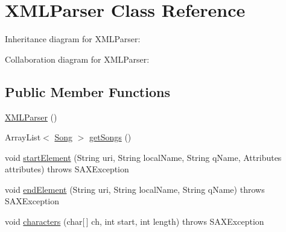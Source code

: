 \hypertarget{classcom_1_1axcoto_1_1shinjuku_1_1maki_1_1_x_m_l_parser}{\section{\-X\-M\-L\-Parser \-Class \-Reference}
\label{classcom_1_1axcoto_1_1shinjuku_1_1maki_1_1_x_m_l_parser}
}


\-Inheritance diagram for \-X\-M\-L\-Parser\-:


\-Collaboration diagram for \-X\-M\-L\-Parser\-:
\subsection*{\-Public \-Member \-Functions}
\begin{DoxyCompactItemize}
\item 
\hyperlink{classcom_1_1axcoto_1_1shinjuku_1_1maki_1_1_x_m_l_parser_add38127cef2d42fb1b0c72e937579a3e}{\-X\-M\-L\-Parser} ()
\item 
\-Array\-List$<$ \hyperlink{classcom_1_1axcoto_1_1shinjuku_1_1maki_1_1_song}{\-Song} $>$ \hyperlink{classcom_1_1axcoto_1_1shinjuku_1_1maki_1_1_x_m_l_parser_a64be53a96bb0b714cb4d539e4010425d}{get\-Songs} ()
\item 
void \hyperlink{classcom_1_1axcoto_1_1shinjuku_1_1maki_1_1_x_m_l_parser_a498ebb87fe1777ffb95b7425e8d91fc5}{start\-Element} (\-String uri, \-String local\-Name, \-String q\-Name, \-Attributes attributes)  throws S\-A\-X\-Exception 
\item 
void \hyperlink{classcom_1_1axcoto_1_1shinjuku_1_1maki_1_1_x_m_l_parser_a10611466eae545076e06b863ab61bddc}{end\-Element} (\-String uri, \-String local\-Name, \-String q\-Name)  throws S\-A\-X\-Exception 
\item 
void \hyperlink{classcom_1_1axcoto_1_1shinjuku_1_1maki_1_1_x_m_l_parser_a8e0a2995a5f76a4219f28299cbd7645f}{characters} (char\mbox{[}$\,$\mbox{]} ch, int start, int length)  throws S\-A\-X\-Exception 
\end{DoxyCompactItemize}
